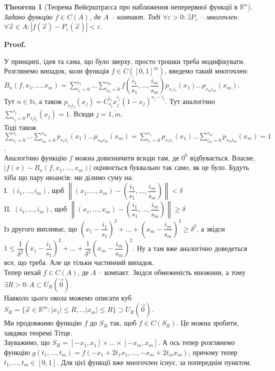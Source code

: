 \documentclass[a4paper, 10pt]{article}
\makeatletter
\def\qed{$\blacksquare$}
\theoremstyle{theoremdd}
\newtheorem{theorem}{Theorem}[subsection]
\theoremstyle{theoremdd}
\theoremstyle{theoremdd}
\theoremstyle{theoremdd}
\theoremstyle{theoremdd}
\theoremstyle{theoremdd}
\theoremstyle{theoremdd}
\theoremstyle{theoremdd}
\renewenvironment{proof}[1][Proof.\\]{\par
\pushQED{\hfill \qed}%
\normalfont \topsep6\p@\@plus6\p@\relax
\trivlist
\item\relax
{\bfseries
#1\@addpunct{.}}\hspace\labelsep\ignorespaces
}{%
\popQED\endtrivlist\@endpefalse
}
\newcommand\Norm[1]{\left\lVert#1\right\rVert}
\makeatother
\begin{document}
\begin{theorem}[Теорема Вейєрштрасса про наближення неперервної функції в $\mathbb{R}^n$]
Задано функцію $f \in C(A)$, де $A$ -- компакт. Тоді $\forall \varepsilon > 0: \exists P_\varepsilon$ -- многочлен: $\forall \vec{x} \in A: |f(\vec{x}) - P_\varepsilon(\vec{x})| < \varepsilon$.
\end{theorem}

\begin{proof}
У принципі, ідея та сама, що було зверху, просто трошки треба модифікувати.\\
Розглянемо випадок, коли функція $f \in C([0,1]^m)$, введемо такий многочлен:\\
$B_n(f,x_1,\dots,x_m) = \displaystyle\sum_{i_1=0}^{s_1} \dots \sum_{i_m=0}^{s_m} f\left( \dfrac{i_1}{s_1},\dots,\dfrac{i_m}{s_m} \right) p_{s_1 i_1}(x_1) \dots p_{s_m i_m}(x_m)$.\\
Тут $n \in \mathbb{N}$, а також $p_{s_j i_j}(x_j) = C_{s_j}^{i_j} x_j^{i_j}(1-x_j)^{s_j-i_j}$. Тут аналогічно $\displaystyle\sum_{i_j=0}^{s_j} p_{s_ji_j}(x_j) = 1$. Всюди $j = \overline{1,m}$.\\
Тоді також $\displaystyle\sum_{i_1=0}^{s_1} \dots \sum_{i_m=0}^{s_m} p_{s_1i_1}(x_1) \dots p_{s_m i_m}(x_m) = \sum_{i_1=0}^{s_1} p_{s_1i_1}(x_1) \dots \sum_{i_m = 0}^{s_m} p_{s_m i_m}(x_m) = 1$.\\
Аналогічно функцію $f$ можна довизначити всюди там, де $0^0$ відбувається. Власне,\\
$|f(x) - B_n(f,x_1,\dots,x_m)|$ оцінюється буквально так само, як це було. Будуть хіба що пару нюансів: ми ділимо суму на: \\
I. $(i_1,\dots,i_m)$, щоб $\Norm{(x_1,\dots,x_m) - \left(\dfrac{i_1}{s_1},\dots,\dfrac{i_m}{s_m} \right)} < \delta$\\
II. $(i_1,\dots,i_m)$, щоб $\Norm{(x_1,\dots,x_m) - \left(\dfrac{i_1}{s_1},\dots,\dfrac{i_m}{s_m} \right)} \geq \delta$\\
Із другого випливає, що $\left( x_1 - \dfrac{i_1}{s_1}\right)^2 + \dots + \left( x_m - \dfrac{i_m}{s_m} \right)^2 \geq \delta^2$, а звідси\\
$1 \leq \dfrac{1}{\delta^2} \left( x_1 - \dfrac{i_1}{s_1}\right)^2 + \dots + \dfrac{1}{\delta^2} \left( x_m - \dfrac{i_m}{s_m}\right)^2$. Ну а там вже аналогічно доведеться все, що треба. Але це тільки частинний випадок.\\
Тепер нехай $f \in C(A)$, де $A$ -- компакт. Звідси обмеженість множини, а тому $\exists R > 0: A \subset U_R(\vec{0})$.\\
Навколо цього окола можемо описати куб $S_R = \{ \vec{x} \in \mathbb{R}^m: |x_1| \leq R, \dots |x_m| \leq R \} \supset U_R(\vec{0})$.\\
Ми продовжимо функцію $f$ до $S_R$ так, щоб $f \in C(S_R)$. Це можна зробити, завдяки теоремі Тітце.\\
Зауважимо, що $S_R = [-x_1,x_1] \times \dots \times [-x_m,x_m]$. А ось тепер розглянемо функцію $g(t_1,\dots,t_m) = f(-x_1+2t_1x_1, \dots, -x_m+2t_mx_m)$, причому тепер $t_1,\dots,t_m \in [0,1]$. Для цієї функції вже многочлен існує, за попереднім пунктом.
\end{proof}
\end{document}
